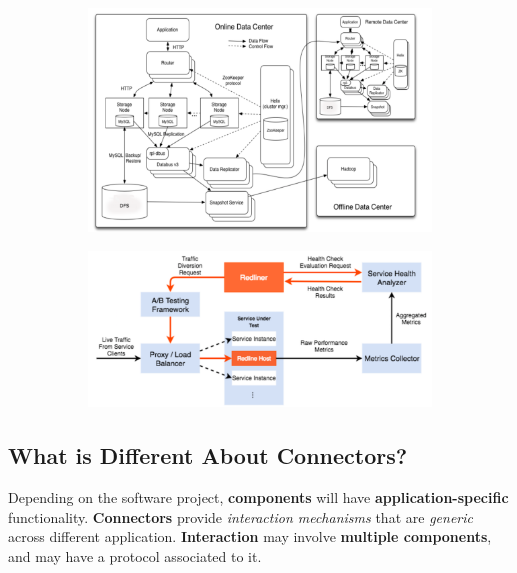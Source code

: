 \documentclass[a4paper]{article}
\begin{document}
\begin{figure}[H]
\centering
\hskip-2.5cm\begin{subfigure}{1\textwidth}
  \includegraphics[width=1\linewidth]
  {images/10-linked.png}
\end{subfigure}
\end{figure}

\begin{figure}[H]
\centering
\hskip-2.5cm\begin{subfigure}{1\textwidth}
  \includegraphics[width=1\linewidth]
  {images/10-linked-redliner.png}
\end{subfigure}
\end{figure}

\subsection{What is Different About Connectors?}
Depending on the software project, \textbf{components} will have \textbf{application-specific} functionality. \textbf{Connectors} provide \textit{interaction mechanisms} that are \textit{generic} across different application. \textbf{Interaction} may involve \textbf{multiple components}, and may have a protocol associated to it.\\
\end{document}
